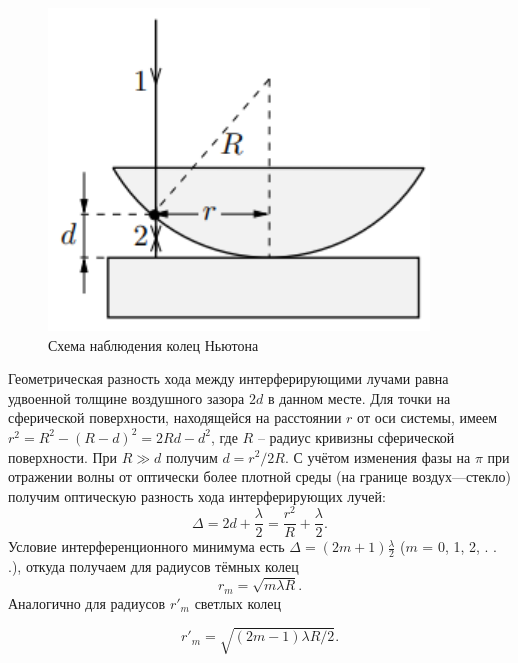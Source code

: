 \documentclass[a4paper,12pt]{article}
\begin{document}
\begin{figure}\label{fig: Линза на пластине}
    \begin{center}
    \vspace{-20pt}
        \includegraphics[width = 0.9\textwidth]{Линза на пластине.png}
    \end{center}
    \caption{ Схема наблюдения
колец Ньютона}
\end{figure}
Геометрическая разность хода между интерферирующими лучами равна удвоенной толщине воздушного зазора $2d$ в данном месте. Для точки на сферической поверхности, находящейся на расстоянии $r$ от оси системы, имеем $r^2 = R^2 - (R - d)^2 = 2Rd - d^2$, где $R$ -- радиус кривизны сферической поверхности. При $R\gg d$ получим $d = r^2/2R$. С учётом изменения фазы на $\pi$ при отражении волны от оптически более плотной среды (на границе воздух—стекло) получим оптическую разность хода интерферирующих лучей:
\begin{equation}\label{eq: Оптическая разность хода для колец Ньютона}
    \Delta = 2d + \frac{\lambda}{2} = \frac{r^2}{R} + \frac{\lambda}{2}.
\end{equation}
Условие интерференционного минимума есть $\Delta = (2m + 1) \frac{\lambda}{2}$ ($m$ = 0, 1, 2, . . .), откуда
получаем для радиусов тёмных колец
\begin{equation}\label{eq: Радиусы темных колец}
    r_m = \sqrt{m \lambda R}.
\end{equation}
Аналогично для радиусов $r'_m$ светлых колец

\begin{equation}\label{eq: Радиусы светлых колец}
    r'_m = \sqrt{(2m - 1) \lambda R / 2}.
\end{equation}
\end{document}
